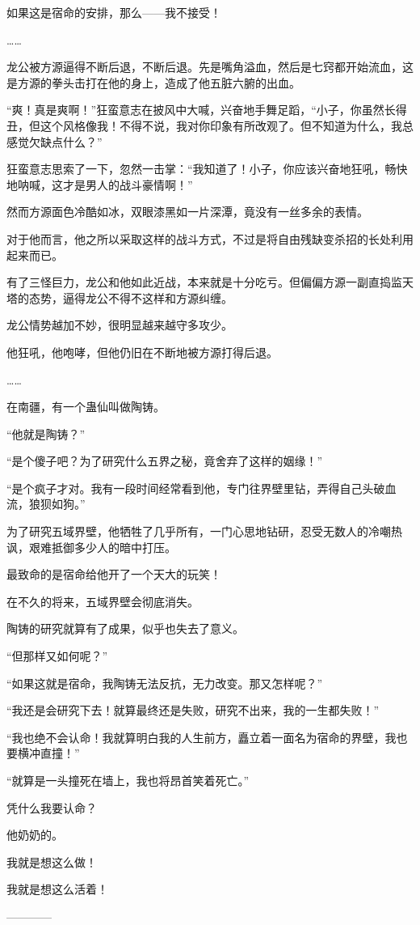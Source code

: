 \begin{this_body}
如果这是宿命的安排，那么——我不接受！

……

龙公被方源逼得不断后退，不断后退。先是嘴角溢血，然后是七窍都开始流血，这是方源的拳头击打在他的身上，造成了他五脏六腑的出血。

“爽！真是爽啊！”狂蛮意志在披风中大喊，兴奋地手舞足蹈，“小子，你虽然长得丑，但这个风格像我！不得不说，我对你印象有所改观了。但不知道为什么，我总感觉欠缺点什么？”

狂蛮意志思索了一下，忽然一击掌：“我知道了！小子，你应该兴奋地狂吼，畅快地呐喊，这才是男人的战斗豪情啊！”

然而方源面色冷酷如冰，双眼漆黑如一片深潭，竟没有一丝多余的表情。

对于他而言，他之所以采取这样的战斗方式，不过是将自由残缺变杀招的长处利用起来而已。

有了三怪巨力，龙公和他如此近战，本来就是十分吃亏。但偏偏方源一副直捣监天塔的态势，逼得龙公不得不这样和方源纠缠。

龙公情势越加不妙，很明显越来越守多攻少。

他狂吼，他咆哮，但他仍旧在不断地被方源打得后退。

……

在南疆，有一个蛊仙叫做陶铸。

“他就是陶铸？”

“是个傻子吧？为了研究什么五界之秘，竟舍弃了这样的姻缘！”

“是个疯子才对。我有一段时间经常看到他，专门往界壁里钻，弄得自己头破血流，狼狈如狗。”

为了研究五域界壁，他牺牲了几乎所有，一门心思地钻研，忍受无数人的冷嘲热讽，艰难抵御多少人的暗中打压。

最致命的是宿命给他开了一个天大的玩笑！

在不久的将来，五域界壁会彻底消失。

陶铸的研究就算有了成果，似乎也失去了意义。

“但那样又如何呢？”

“如果这就是宿命，我陶铸无法反抗，无力改变。那又怎样呢？”

“我还是会研究下去！就算最终还是失败，研究不出来，我的一生都失败！”

“我也绝不会认命！我就算明白我的人生前方，矗立着一面名为宿命的界壁，我也要横冲直撞！”

“就算是一头撞死在墙上，我也将昂首笑着死亡。”

凭什么我要认命？

他奶奶的。

我就是想这么做！

我就是想这么活着！

------------

\end{this_body}

